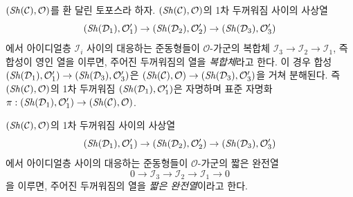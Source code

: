 \begin{remark}
\label{remark-short-exact-sequence-thickenings-ringed-topoi}
$(\mathop{\mathit{Sh}}\nolimits(\mathcal{C}), \mathcal{O})$를 환 달린 토포스라 하자.
$(\mathop{\mathit{Sh}}\nolimits(\mathcal{C}), \mathcal{O})$의 1차 두꺼워짐 사이의 사상열
$$
(\mathop{\mathit{Sh}}\nolimits(\mathcal{D}_1), \mathcal{O}'_1) \to
(\mathop{\mathit{Sh}}\nolimits(\mathcal{D}_2), \mathcal{O}'_2) \to
(\mathop{\mathit{Sh}}\nolimits(\mathcal{D}_3), \mathcal{O}'_3)
$$
에서 아이디얼층 $\mathcal{I}_i$ 사이의 대응하는 준동형들이
$\mathcal{O}$-가군의 복합체
$\mathcal{I}_3 \to \mathcal{I}_2 \to \mathcal{I}_1$, 즉 합성이 영인 열을
이루면, 주어진 두꺼워짐의 열을 {\it 복합체}라고 한다. 이 경우 합성
$(\mathop{\mathit{Sh}}\nolimits(\mathcal{D}_1), \mathcal{O}'_1) \to
(\mathop{\mathit{Sh}}\nolimits(\mathcal{D}_3), \mathcal{O}'_3)$은
$(\mathop{\mathit{Sh}}\nolimits(\mathcal{C}), \mathcal{O}) \to
(\mathop{\mathit{Sh}}\nolimits(\mathcal{D}_3), \mathcal{O}'_3)$을 거쳐 분해된다. 즉
$(\mathop{\mathit{Sh}}\nolimits(\mathcal{C}), \mathcal{O})$의 1차 두꺼워짐
$(\mathop{\mathit{Sh}}\nolimits(\mathcal{D}_1), \mathcal{O}'_1)$은 자명하며 표준 자명화
$\pi : (\mathop{\mathit{Sh}}\nolimits(\mathcal{D}_1), \mathcal{O}'_1) \to
(\mathop{\mathit{Sh}}\nolimits(\mathcal{C}), \mathcal{O})$.

\medskip\noindent
$(\mathop{\mathit{Sh}}\nolimits(\mathcal{C}), \mathcal{O})$의 1차 두꺼워짐 사이의 사상열
$$
(\mathop{\mathit{Sh}}\nolimits(\mathcal{D}_1), \mathcal{O}'_1) \to
(\mathop{\mathit{Sh}}\nolimits(\mathcal{D}_2), \mathcal{O}'_2) \to
(\mathop{\mathit{Sh}}\nolimits(\mathcal{D}_3), \mathcal{O}'_3)
$$
에서 아이디얼층 사이의 대응하는 준동형들이 $\mathcal{O}$-가군의
짧은 완전열
$$
0 \to \mathcal{I}_3 \to \mathcal{I}_2 \to \mathcal{I}_1 \to 0
$$
을 이루면, 주어진 두꺼워짐의 열을 {\it 짧은 완전열}이라고 한다.
\end{remark}

